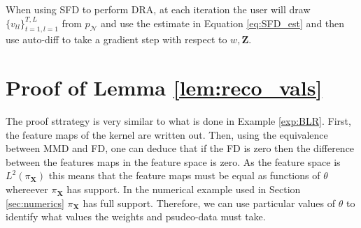 \documentclass[hyperref]{article}
\theoremstyle{plain}
\theoremstyle{remark}
\newcommand{\bX}{\mathbf{X}}
\newcommand{\bZ}{\mathbf{Z}}
\begin{document}
When using SFD to perform DRA, at each iteration the user will draw $\{v_{tl}\}_{t=1,l=1}^{T,L}$ from $p_{\mathcal{N}}$ and use the estimate in Equation \eqref{eq:SFD_est} and then use auto-diff to take a gradient step with respect to $w,\bZ$. 

\section{Proof of Lemma \ref{lem:reco_vals}}
The proof sttrategy is very similar to what is done in Example \ref{exp:BLR}. First, the feature maps of the kernel are written out. Then, using the equivalence between MMD and FD, one can deduce that if the FD is zero then the difference between the features maps in the feature space is zero. As the feature space is $L^{2}(\pi_{\bX})$ this means that the feature maps must be equal as functions of $\theta$ whereever $\pi_{\bX}$ has support. In the numerical example used in Section \ref{sec:numerics} $\pi_{\bX}$ has full support. Therefore, we can use particular values of $\theta$ to identify what values the weights and psudeo-data must take. 
\end{document}
